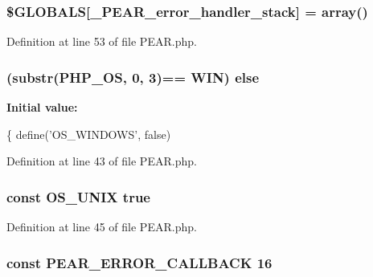 \subsubsection[{\$\+G\+L\+O\+B\+A\+L\+S}]{\setlength{\rightskip}{0pt plus 5cm}\$G\+L\+O\+B\+A\+L\+S\mbox{[}\textquotesingle{}\+\_\+\+P\+E\+A\+R\+\_\+error\+\_\+handler\+\_\+stack\textquotesingle{}\mbox{]} = array()}\label{PEAR_8php_ae888e544d830e6c8570cd51fd614de27}


Definition at line 53 of file P\+E\+A\+R.\+php.

\hypertarget{PEAR_8php_aa8a49739e8eb898476e14127c4cd0a49}{}
\subsubsection[{else}]{ (substr(P\+H\+P\+\_\+\+O\+S, 0, 3)== \textquotesingle{}W\+I\+N\textquotesingle{}) else}\label{PEAR_8php_aa8a49739e8eb898476e14127c4cd0a49}
{\bfseries Initial value\+:}
\begin{DoxyCode}
\{
    define(\textcolor{stringliteral}{'OS\_WINDOWS'}, \textcolor{keyword}{false})
\end{DoxyCode}


Definition at line 43 of file P\+E\+A\+R.\+php.

\hypertarget{PEAR_8php_aac9eed8b1212799624da961df2b7469f}{}
\subsubsection[{O\+S\+\_\+\+U\+N\+I\+X}]{\setlength{\rightskip}{0pt plus 5cm}const O\+S\+\_\+\+U\+N\+I\+X true}\label{PEAR_8php_aac9eed8b1212799624da961df2b7469f}


Definition at line 45 of file P\+E\+A\+R.\+php.

\hypertarget{PEAR_8php_ad1780c583741d97d9a2b3077516744af}{}
\subsubsection[{P\+E\+A\+R\+\_\+\+E\+R\+R\+O\+R\+\_\+\+C\+A\+L\+L\+B\+A\+C\+K}]{\setlength{\rightskip}{0pt plus 5cm}const P\+E\+A\+R\+\_\+\+E\+R\+R\+O\+R\+\_\+\+C\+A\+L\+L\+B\+A\+C\+K 16}\label{PEAR_8php_ad1780c583741d97d9a2b3077516744af}


